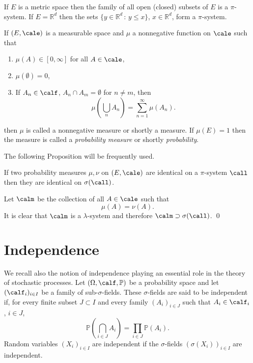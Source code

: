 \documentclass[preprint]{imsart}
\def\P{\mathbb P}
\def\R{\mathbb R}
\begin{document}
{If $E$ is a metric space then the family of all open
(closed) subsets of $E$ is a $\pi$-system. If $E=\R^d$
then the sets $\{y\in\R^d\, : \, y\leq x\}$,
$x\in\R^d$, form a $\pi$-system.


If $(E,\cale)$ is a measurable space and $\mu $ a
nonnegative function  on $\cale$ such that
\begin{enumerate}
  \item[1)] $\mu (A)\in [0, \infty ]$ for all $A\in \cale$,

  \item[2)] $\mu(\emptyset) = 0 $,

  \item[3)] If $A_n\in\calf$, $A_n\cap A_m=\emptyset$
  for $n\ne m$, then
  $$
  \mu (\bigcup_nA_n)=\sum_{n=1}^\infty \mu (A_n).
  $$

\end{enumerate}
then $\mu$ is called a nonnegative measure or shortly a measure.
If $\mu (E) =1$ then the measure is called a {\em probability measure} or
shortly {\em probability}.

The following Proposition will be frequently used.




\begin{Proposition}
  If two probability measures $\mu,\nu$ on $(E,\cale )$
  are identical on a $\pi$-system $\call$ then they
  are identical on $\sigma(\call)$.
\end{Proposition}

Let $\calm$ be the collection of all $A\in\cale$ such
that
$$
\mu(A)=\nu(A).
$$
It is clear that $\calm$ is a $\lambda$-system and
therefore $\calm\supset\sigma(\call)$. \qed





\section{Independence}
We recall also the notion of independence playing an essential
role in the theory of stochastic processes.
Let $(\Omega,\calf,\P)$ be a probability space and let
$(\calf_i)_{i\in I}$ be a family of
sub-$\sigma$-fields. These $\sigma$-fields are said to
be independent if, for every finite subset $J\subset I$
and every family $(A_i)_{i\in J}$ such that
$A_i\in\calf_i$, $i\in J$,
\begin{equation}\label{indep}
  \P\left( \bigcap_{i\in J}A_i\right) =
  \prod_{i\in J} \P\left(A_i\right).
\end{equation}
Random variables $(X_i)_{i\in I}$ are independent if
the $\sigma$-fields $(\sigma(X_i))_{i\in I}$ are
independent.

}
\end{document}
